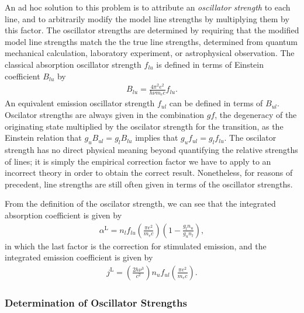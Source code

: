 An ad hoc solution to this problem is to attribute an
\emph{oscillator strength} to each line, and to arbitrarily
modify the model line strengths by multiplying them by this
factor. The oscillator strengths are determined by requiring
that the modified model line strengths match the the true
line strengths, determined from quantum mechanical
calculation, laboratory experiment, or astrophysical
observation. The classical absorption oscillator strength
$f_{lu}$ is defined in terms of Einstein coefficient
$B_{lu}$ by
\begin{align}
B_{lu} = \frac{4\pi^2 e^2}{h\nu m_e c} f_{lu}.
\end{align}
An equivalent emission oscillator strength $f_{ul}$ can be
defined in terms of $B_{ul}$. Oscilator strengths are always
given in the combination $gf$, the degeneracy of the
originating state multiplied by the oscilator strength for
the transition, as the Einstein relation that $g_u B_{ul} =
g_l B_{lu}$ implies that $g_u f_{ul} = g_l f_{lu}$. The
oscilator strength has no direct physical meaning beyond
quantifying the relative strengths of lines; it is simply
the empirical correction factor we have to apply to an
incorrect theory in order to obtain the correct result.
Nonetheless, for reasons of precedent, line strengths are
still often given in terms of the oscillator strengths.

From the definition of the oscilator strength, we can see
that the integrated absorption coefficient is given by
\begin{align}
\alpha^\mathrm{L} =  n_l f_{lu}\left(\frac{\pi e^2}{m_e c}\right)\left(1 - \frac{g_l n_u}{g_u n_l}\right),
\end{align}
in which the last factor is the correction for stimulated
emission, and the integrated emission coefficient is given
by
\begin{align}
j^\mathrm{L} = \left(\frac{2h\nu^3}{c^2}\right)n_u
f_{ul}\left(\frac{\pi e^2}{m_e c}\right).
\end{align}

\subsubsection{Determination of Oscillator Strengths}


